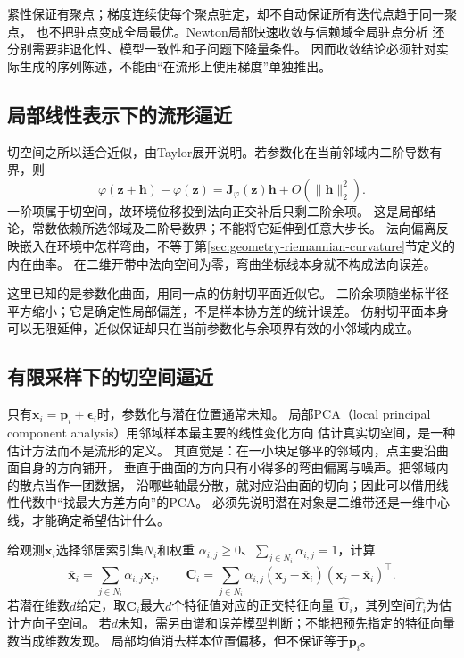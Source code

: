 紧性保证有聚点；梯度连续使每个聚点驻定，却不自动保证所有迭代点趋于同一聚点，
也不把驻点变成全局最优。Newton局部快速收敛与信赖域全局驻点分析
还分别需要非退化性、模型一致性和子问题下降量条件。
因而收敛结论必须针对实际生成的序列陈述，不能由“在流形上使用梯度”单独推出。

\subsection{局部线性表示下的流形逼近}
\label{sec:geometry-local-linear-approximation}

切空间之所以适合近似，由Taylor展开说明。若参数化在当前邻域内二阶导数有界，则
\begin{equation}
 \varphi(\bm z+\bm h)-\varphi(\bm z)
 =\bm J_\varphi(\bm z)\bm h+O(\lVert\bm h\rVert_2^2).
 \label{eq:geometry-manifold-local-taylor}
\end{equation}
一阶项属于切空间，故环境位移投到法向正交补后只剩二阶余项。
这是局部结论，常数依赖所选邻域及二阶导数界；不能将它延伸到任意大步长。
法向偏离反映嵌入在环境中怎样弯曲，不等于第\ref{sec:geometry-riemannian-curvature}节定义的内在曲率。
在二维开带中法向空间为零，弯曲坐标线本身就不构成法向误差。


这里已知的是参数化曲面，用同一点的仿射切平面近似它。
二阶余项随坐标半径平方缩小；它是确定性局部偏差，不是样本协方差的统计误差。
仿射切平面本身可以无限延伸，近似保证却只在当前参数化与余项界有效的小邻域内成立。

\subsection{有限采样下的切空间逼近}
\label{sec:geometry-sampled-local-linearization}

只有$\bm x_i=\bm p_i+\bm\epsilon_i$时，参数化与潜在位置通常未知。
局部PCA（local principal component analysis）用邻域样本最主要的线性变化方向
估计真实切空间，是一种估计方法而不是流形的定义。
其直觉是：在一小块足够平的邻域内，点主要沿曲面自身的方向铺开，
垂直于曲面的方向只有小得多的弯曲偏离与噪声。把邻域内的散点当作一团数据，
沿哪些轴最分散，就对应沿曲面的切向；因此可以借用线性代数中“找最大方差方向”的PCA。
必须先说明潜在对象是二维带还是一维中心线，才能确定希望估计什么。

给观测$\bm x_i$选择邻居索引集$N_i$和权重
$\alpha_{i,j}\geq0$、$\sum_{j\in N_i}\alpha_{i,j}=1$，计算
\begin{equation}
 \overline{\bm x}_i=\sum_{j\in N_i}\alpha_{i,j}\bm x_j,\qquad
 \bm C_i=\sum_{j\in N_i}\alpha_{i,j}
  (\bm x_j-\overline{\bm x}_i)(\bm x_j-\overline{\bm x}_i)^\top.
 \label{eq:geometry-local-weighted-covariance}
\end{equation}
若潜在维数$d$给定，取$\bm C_i$最大$d$个特征值对应的正交特征向量
$\widehat{\bm U}_i$，其列空间$\widehat T_i$为估计方向子空间。
若$d$未知，需另由谱和误差模型判断；不能把预先指定的特征向量数当成维数发现。
局部均值消去样本位置偏移，但不保证等于$\bm p_i$。

